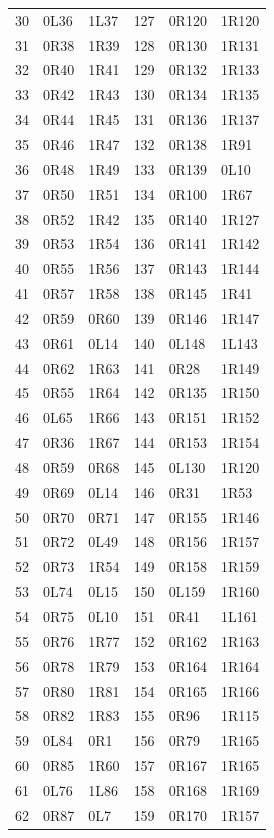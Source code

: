 {\begin{longtable}{rll@{\hspace{0.7in}}rll}
30 & 0L36 & 1L37 & 127 & 0R120 & 1R120\\
31 & 0R38 & 1R39 & 128 & 0R130 & 1R131\\
32 & 0R40 & 1R41 & 129 & 0R132 & 1R133\\
33 & 0R42 & 1R43 & 130 & 0R134 & 1R135\\
34 & 0R44 & 1R45 & 131 & 0R136 & 1R137\\
35 & 0R46 & 1R47 & 132 & 0R138 & 1R91\\
36 & 0R48 & 1R49 & 133 & 0R139 & 0L10\\
37 & 0R50 & 1R51 & 134 & 0R100 & 1R67\\
38 & 0R52 & 1R42 & 135 & 0R140 & 1R127\\
39 & 0R53 & 1R54 & 136 & 0R141 & 1R142\\
40 & 0R55 & 1R56 & 137 & 0R143 & 1R144\\
41 & 0R57 & 1R58 & 138 & 0R145 & 1R41\\
42 & 0R59 & 0R60 & 139 & 0R146 & 1R147\\
43 & 0R61 & 0L14 & 140 & 0L148 & 1L143\\
44 & 0R62 & 1R63 & 141 & 0R28 & 1R149\\
45 & 0R55 & 1R64 & 142 & 0R135 & 1R150\\
46 & 0L65 & 1R66 & 143 & 0R151 & 1R152\\
47 & 0R36 & 1R67 & 144 & 0R153 & 1R154\\
48 & 0R59 & 0R68 & 145 & 0L130 & 1R120\\
49 & 0R69 & 0L14 & 146 & 0R31 & 1R53\\
50 & 0R70 & 0R71 & 147 & 0R155 & 1R146\\
51 & 0R72 & 0L49 & 148 & 0R156 & 1R157\\
52 & 0R73 & 1R54 & 149 & 0R158 & 1R159\\
53 & 0L74 & 0L15 & 150 & 0L159 & 1R160\\
54 & 0R75 & 0L10 & 151 & 0R41 & 1L161\\
55 & 0R76 & 1R77 & 152 & 0R162 & 1R163\\
56 & 0R78 & 1R79 & 153 & 0R164 & 1R164\\
57 & 0R80 & 1R81 & 154 & 0R165 & 1R166\\
58 & 0R82 & 1R83 & 155 & 0R96 & 1R115\\
59 & 0L84 & 0R1 & 156 & 0R79 & 1R165\\
60 & 0R85 & 1R60 & 157 & 0R167 & 1R165\\
61 & 0L76 & 1L86 & 158 & 0R168 & 1R169\\
62 & 0R87 & 0L7 & 159 & 0R170 & 1R157\\

\end{longtable}}
